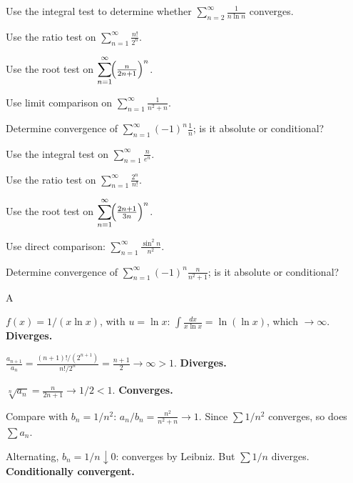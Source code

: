 \documentclass[11pt]{article}
\begin{document}
\begin{problems}
\item Use the integral test to determine whether $\displaystyle \sum_{n=2}^\infty \frac{1}{n \ln n}$ converges.
\item Use the ratio test on $\displaystyle \sum_{n=1}^\infty \frac{n!}{2^n}$.
\item Use the root test on $\displaystyle \sum_{n=1}^\infty \!\Bigl(\tfrac{n}{2n+1}\Bigr)^n$.
\item Use limit comparison on $\displaystyle \sum_{n=1}^\infty \frac{1}{n^2 + n}$.
\item Determine convergence of $\displaystyle \sum_{n=1}^\infty (-1)^n \frac{1}{n}$; is it absolute or conditional?
\end{problems}

\vfill
\newpage
{}
\begin{problems}
\item Use the integral test on $\displaystyle \sum_{n=1}^\infty \frac{n}{e^n}$.
\item Use the ratio test on $\displaystyle \sum_{n=1}^\infty \frac{2^n}{n!}$.
\item Use the root test on $\displaystyle \sum_{n=1}^\infty \!\Bigl(\tfrac{2n + 1}{3n}\Bigr)^n$.
\item Use direct comparison: $\displaystyle \sum_{n=1}^\infty \frac{\sin^2 n}{n^2}$.
\item Determine convergence of $\displaystyle \sum_{n=1}^\infty (-1)^n \frac{n}{n^2+1}$; is it absolute or conditional?
\end{problems}

\vfill
\newpage
{}

\begin{answers}{A}
\item $f(x) = 1/(x \ln x)$, with $u = \ln x$: $\int \tfrac{dx}{x \ln x} = \ln(\ln x)$, which $\to \infty$. \textbf{Diverges.}
\item $\tfrac{a_{n+1}}{a_n} = \tfrac{(n+1)!/(2^{n+1})}{n!/2^n} = \tfrac{n+1}{2} \to \infty > 1$. \textbf{Diverges.}
\item $\sqrt[n]{a_n} = \tfrac{n}{2n+1} \to 1/2 < 1$. \textbf{Converges.}
\item Compare with $b_n = 1/n^2$: $a_n/b_n = \tfrac{n^2}{n^2 + n} \to 1$. Since $\sum 1/n^2$ converges, so does $\sum a_n$.
\item Alternating, $b_n = 1/n \downarrow 0$: converges by Leibniz. But $\sum 1/n$ diverges. \textbf{Conditionally convergent.}
\end{answers}
\end{document}
